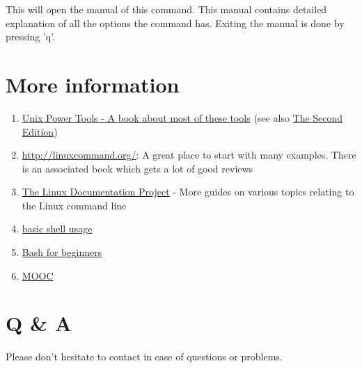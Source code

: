 This will open the manual of this command. This manual contains detailed explanation of
all the options the command has. Exiting the manual is done by pressing 'q'.


\chapter{More information}

\begin{enumerate}
 \item \href{http://www.docstore.mik.ua/orelly/unix/upt/index.htm}{Unix Power
 Tools - A  book about most of these tools} (see also
 \href{http://www.docstore.mik.ua/orelly/unix2.1/index.htm}{The Second Edition})
 \item \url{http://linuxcommand.org/}: A great place to start with many examples. There is an associated book which gets a lot of good reviews
 \item \href{http://www.tldp.org/guides.html}{The Linux Documentation Project} - More guides on various topics relating to the Linux command line
 \item \href{http://linuxcommand.org/lc3_learning_the_shell.php}{basic shell usage}
 \item \href{http://www.tldp.org/LDP/Bash-Beginners-Guide/html/Bash-Beginners-Guide.html}{Bash for beginners}
 \item \href{https://www.edx.org/course/introduction-linux-linuxfoundationx-lfs101x-0}{MOOC}
\end{enumerate}

\chapter{Q \& A}

Please don't hesitate to contact \hpcinfo in case of questions or problems.
